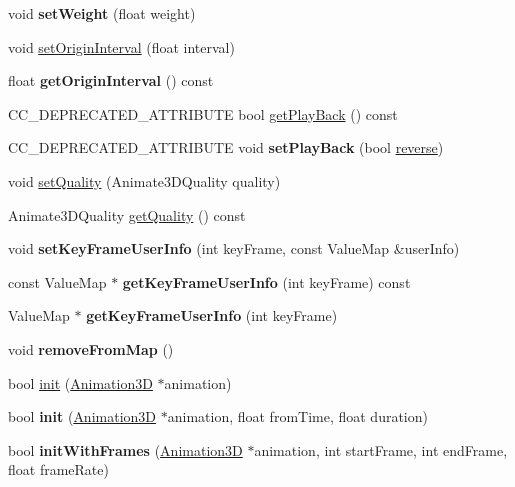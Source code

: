 \begin{DoxyCompactItemize}
void {\bfseries set\+Weight} (float weight)
\item 
void \hyperlink{classAnimate3D_a1b01bd49f7aaa50586f21d41137555c2}{set\+Origin\+Interval} (float interval)
\item 
\mbox{\label{classAnimate3D_a428a507dd96210b1399ed1de8f096d29}} 
float {\bfseries get\+Origin\+Interval} () const
\item 
C\+C\+\_\+\+D\+E\+P\+R\+E\+C\+A\+T\+E\+D\+\_\+\+A\+T\+T\+R\+I\+B\+U\+TE bool \hyperlink{classAnimate3D_ac9ca6671172132e1e29ceeb810df4ba4}{get\+Play\+Back} () const
\item 
\mbox{\label{classAnimate3D_ae71e30a9bea943566d828ddfd9e700e8}} 
C\+C\+\_\+\+D\+E\+P\+R\+E\+C\+A\+T\+E\+D\+\_\+\+A\+T\+T\+R\+I\+B\+U\+TE void {\bfseries set\+Play\+Back} (bool \hyperlink{classAnimate3D_aa8acc0668132f57fee370bfdbea308cb}{reverse})
\item 
void \hyperlink{classAnimate3D_a0dd43ee90872c19d04c87904fceb99a6}{set\+Quality} (Animate3\+D\+Quality quality)
\item 
Animate3\+D\+Quality \hyperlink{classAnimate3D_af9e4be0cb5896579154c7dd971315914}{get\+Quality} () const
\item 
\mbox{\label{classAnimate3D_a92074f1cf279429fa72051702f14e59c}} 
void {\bfseries set\+Key\+Frame\+User\+Info} (int key\+Frame, const Value\+Map \&user\+Info)
\item 
\mbox{\label{classAnimate3D_a9e1e86c94bec416b77009103df32272a}} 
const Value\+Map $\ast$ {\bfseries get\+Key\+Frame\+User\+Info} (int key\+Frame) const
\item 
\mbox{\label{classAnimate3D_a0d9df2026c7d4f82bdf65d4f55f81906}} 
Value\+Map $\ast$ {\bfseries get\+Key\+Frame\+User\+Info} (int key\+Frame)
\item 
\mbox{\label{classAnimate3D_a044297fc83835844b19474d4179a24b1}} 
void {\bfseries remove\+From\+Map} ()
\item 
bool \hyperlink{classAnimate3D_a08ca260aabb4f6569dd1ced348309aaf}{init} (\hyperlink{classAnimation3D}{Animation3D} $\ast$animation)
\item 
\mbox{\label{classAnimate3D_a300abdd17ec48a6609147664a33b5208}} 
bool {\bfseries init} (\hyperlink{classAnimation3D}{Animation3D} $\ast$animation, float from\+Time, float duration)
\item 
\mbox{\label{classAnimate3D_af2c95c3e14ca8a176b34883e7e76e056}} 
bool {\bfseries init\+With\+Frames} (\hyperlink{classAnimation3D}{Animation3D} $\ast$animation, int start\+Frame, int end\+Frame, float frame\+Rate)
\end{DoxyCompactItemize}
